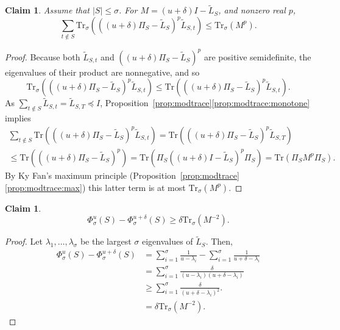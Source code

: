 \documentclass[11pt]{article}
\def\trace#1{\mathrm{Tr} \left(#1 \right)}
\def\Ltil{\widetilde{L}}
\def\pleq{\preccurlyeq}
\def\sizeof#1{\left|#1  \right|}
\def\trs#1{\mathrm{Tr}_{\sigma} \left(#1 \right)}
\newtheorem{claim}[theorem]{Claim}
\begin{document}
\begin{claim}\label{clm:barrierSPart}
Assume that $\sizeof{S} \leq  \sigma$. 
For $M = (u+\delta)I - \Ltil_{S}$, and nonzero real  $p$,
\[
  \sum_{t \not \in S} 
  \trs{\left( (u+\delta)\Pi_{S} - \Ltil_{S} \right)^{p} \Ltil_{S,t}}
\leq
  \trs{M^{p}}.
\]
\end{claim}
\begin{proof}
Because both $\Ltil_{S,t}$ and $\left( (u+\delta)\Pi_{S} - \Ltil_{S} \right)^{p}$ are positive semidefinite, the eigenvalues of their product are nonnegative, and so 
\[
  \trs{\left( (u+\delta)\Pi_{S} - \Ltil_{S} \right)^{p} \Ltil_{S,t}}
\leq 
  \trace{\left( (u+\delta)\Pi_{S} - \Ltil_{S} \right)^{p} \Ltil_{S,t}}.
\] 
As $\sum_{t \not \in S} \Ltil_{S,t} = \Ltil_{S,T} \pleq I$, 
  Proposition~\ref{prop:modtrace}\ref{prop:modtrace:monotone} implies
\begin{multline*}
  \sum_{t \not \in S} 
  \trace{\left( (u+\delta)\Pi_{S} - \Ltil_{S} \right)^{p} \Ltil_{S,t}}
=
  \trace{\left( (u+\delta)\Pi_{S} - \Ltil_{S} \right)^{p} \Ltil_{S,T}}
\\
  \leq 
  \trace{\left( (u+\delta)\Pi_{S} - \Ltil_{S} \right)^{p}}
  = 
    \trace{\Pi_{S} \left( (u+\delta) I - \Ltil_{S} \right)^{p} \Pi_{S}}
    = 
        \trace{\Pi_{S} M^{p} \Pi_{S}}.
\end{multline*}
By Ky Fan's maximum principle (Proposition~\ref{prop:modtrace}\ref{prop:modtrace:max})
  this latter term is at most $\trs{M^{p}}$.
\end{proof}



\begin{claim}\label{clm:barrierPhi}
\[
\Phi^{u}_{\sigma} (S) - \Phi^{u+\delta }_{\sigma} (S) 
\geq 
\delta \trs{M^{-2}}.
\]
\end{claim}
\begin{proof}
Let $\lambda_{1}, \dotsc , \lambda_{\sigma}$
  be the largest $\sigma$ eigenvalues of $\Ltil_{S}$.
Then,
\begin{align*}
\Phi^{u}_{\sigma} (S) - \Phi^{u+\delta }_{\sigma} (S)
& =
  \sum_{i=1}^{\sigma} \frac{1}{u - \lambda_{i}}
- 
  \sum_{i=1}^{\sigma} \frac{1}{u + \delta - \lambda_{i}}
\\
& =
  \sum_{i=1}^{\sigma} \frac{\delta }{(u - \lambda_{i}) (u + \delta - \lambda_{i})}
\\
& \geq 
  \sum_{i=1}^{\sigma} \frac{\delta }{(u + \delta - \lambda_{i})^{2}}.
\\
& = 
 \delta \trs{M^{-2}}.
\end{align*}
\end{proof}
\end{document}
